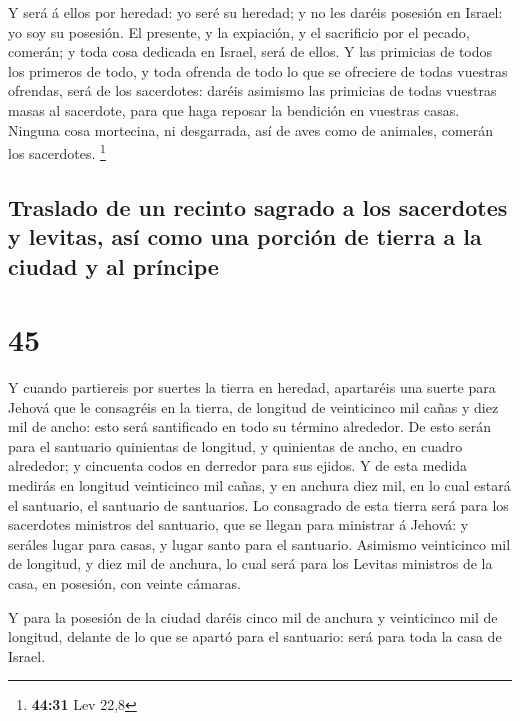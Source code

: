  Y será á ellos por heredad: yo seré su heredad; y no les
daréis posesión en Israel: yo soy su posesión.  El
presente, y la expiación, y el sacrificio por el pecado, comerán; y toda
cosa dedicada en Israel, será de ellos.  Y las primicias
de todos los primeros de todo, y toda ofrenda de todo lo que se
ofreciere de todas vuestras ofrendas, será de los sacerdotes: daréis
asimismo las primicias de todas vuestras masas al sacerdote, para que
haga reposar la bendición en vuestras casas.  Ninguna
cosa mortecina, ni desgarrada, así de aves como de animales, comerán los
sacerdotes. \footnote{\textbf{44:31} Lev 22,8}

\hypertarget{traslado-de-un-recinto-sagrado-a-los-sacerdotes-y-levitas-asuxed-como-una-porciuxf3n-de-tierra-a-la-ciudad-y-al-pruxedncipe}{%
\subsection{Traslado de un recinto sagrado a los sacerdotes y levitas,
así como una porción de tierra a la ciudad y al
príncipe}\label{traslado-de-un-recinto-sagrado-a-los-sacerdotes-y-levitas-asuxed-como-una-porciuxf3n-de-tierra-a-la-ciudad-y-al-pruxedncipe}}

\hypertarget{section-44}{%
\section{45}\label{section-44}}

 Y cuando partiereis por suertes la tierra en heredad,
apartaréis una suerte para Jehová que le consagréis en la tierra, de
longitud de veinticinco mil cañas y diez mil de ancho: esto será
santificado en todo su término alrededor.  De esto serán
para el santuario quinientas de longitud, y quinientas de ancho, en
cuadro alrededor; y cincuenta codos en derredor para sus ejidos.
 Y de esta medida medirás en longitud veinticinco mil
cañas, y en anchura diez mil, en lo cual estará el santuario, el
santuario de santuarios.  Lo consagrado de esta tierra
será para los sacerdotes ministros del santuario, que se llegan para
ministrar á Jehová: y seráles lugar para casas, y lugar santo para el
santuario.  Asimismo veinticinco mil de longitud, y diez
mil de anchura, lo cual será para los Levitas ministros de la casa, en
posesión, con veinte cámaras.

 Y para la posesión de la ciudad daréis cinco mil de
anchura y veinticinco mil de longitud, delante de lo que se apartó para
el santuario: será para toda la casa de Israel.

